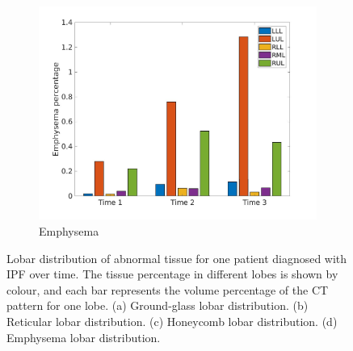 \begin{figure}[H]
\begin{subfigure}{.46\linewidth}
  \includegraphics[width=\linewidth,trim={{.0\wd0} {.0\wd0} {.0\wd0} {.0\wd0}},clip]{QuantitativeAnalysis/Image/IPF21EmphysemaLobarRegionDiseaseDistributionOverTime.jpg}
  \caption{Emphysema}
  \label{fig:IPF21LobarRegionDiseaseDistributionOverTimeMain-d}
\end{subfigure}
\caption{Lobar distribution of abnormal tissue for one patient diagnosed with IPF over time. The tissue percentage in different lobes is shown by colour, and each bar represents the volume percentage of the CT pattern for one lobe. (a) Ground-glass lobar distribution. (b) Reticular lobar distribution. (c) Honeycomb lobar distribution. (d) Emphysema lobar distribution.}
\label{fig:IPF21LobarRegionDiseaseDistributionOverTimeMain}
\end{figure}

